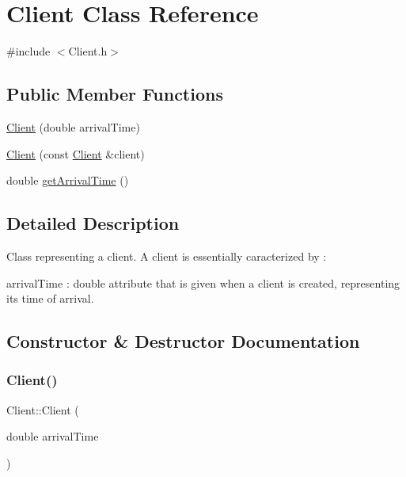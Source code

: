 \hypertarget{classClient}{}\section{Client Class Reference}
\label{classClient}


{\ttfamily \#include $<$Client.\+h$>$}

\subsection*{Public Member Functions}
\begin{DoxyCompactItemize}
\item 
\hyperlink{classClient_a1540718bfe0d1c040821fc2f4598dea1}{Client} (double arrival\+Time)
\item 
\hyperlink{classClient_ab74cbe8124ada5342d56030bd608876b}{Client} (const \hyperlink{classClient}{Client} \&client)
\item 
double \hyperlink{classClient_a748d86e8c875f10a5d92c3cf2a12e621}{get\+Arrival\+Time} ()
\end{DoxyCompactItemize}


\subsection{Detailed Description}
Class representing a client. A client is essentially caracterized by \+:
\begin{DoxyItemize}
\item arrival\+Time \+: double attribute that is given when a client is created, representing it\textquotesingle{}s time of arrival. 
\end{DoxyItemize}

\subsection{Constructor \& Destructor Documentation}
\mbox{\label{classClient_a1540718bfe0d1c040821fc2f4598dea1}} 
\subsubsection{\texorpdfstring{Client()}{Client()}\hspace{0.1cm}{\footnotesize\ttfamily [1/2]}}
{\footnotesize\ttfamily Client\+::\+Client (\begin{DoxyParamCaption}\item[{double}]{arrival\+Time }\end{DoxyParamCaption})\hspace{0.3cm}{\ttfamily [explicit]}}

